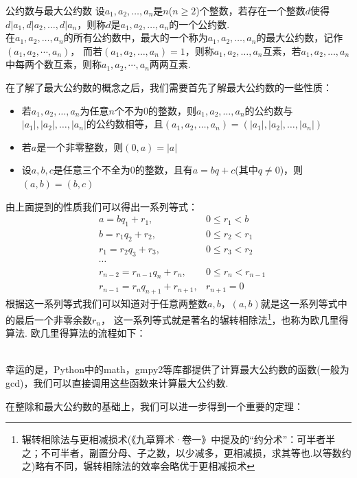 \documentclass{book}
\numberwithin{equation}{subsubsection}
\begin{document}
\begin{concept}{公约数与最大公约数}
设$a_1, a_2,\ldots,a_n$是$n$($n\ge2$)个整数，若存在一个整数$d$使得$d|a_1,d|a_2,\ldots,d|a_n$，则称$d$是$a_1,a_2,\ldots,a_n$的一个公约数.\\
在$a_1, a_2,\ldots,a_n$的所有公约数中，最大的一个称为$a_1, a_2,\ldots,a_n$的最大公约数，记作$(a_1,a_2,\cdots,a_n)$，
而若$(a_1,a_2,\ldots,a_n)=1$，则称$a_1, a_2,\ldots,a_n$互素，若$a_1, a_2,\ldots,a_n$中每两个数互素，则称$a_1, a_2,\cdots,a_n$两两互素.\par
\end{concept}

在了解了最大公约数的概念之后，我们需要首先了解最大公约数的一些性质：
\begin{itemize}
    \item 若$a_1,a_2,\ldots,a_n$为任意$n$个不为$0$的整数，则$a_1,a_2,\ldots,a_n$的公约数与$|a_1|,|a_2|,\ldots,|a_n|$的公约数相等，且$(a_1,a_2,\ldots,a_n)=(|a_1|,|a_2|,\ldots,|a_n|)$
    \item 若$a$是一个非零整数，则$(0,a)=|a|$
    \item 设$a,b,c$是任意三个不全为$0$的整数，且有$a=bq+c$(其中$q\neq0$)，则$(a,b)=(b,c)$
\end{itemize}
由上面提到的性质我们可以得出一系列等式：
\begin{equation}
\begin{aligned}
    &a=bq_1+r_1,&0\leq r_1 < b\\
    &b=r_1q_2+r_2,&0\leq r_2 < r_1\\
    &r_1=r_2q_3+r_3,&0\leq r_3 < r_2\\
    &\cdots\\
    &r_{n-2}=r_{n-1}q_n+r_n,&0\leq r_n < r_{n-1}\\
    &r_{n-1}=r_nq_{n+1}+r_{n+1},&r_{n+1}=0
\end{aligned}
\nonumber
\end{equation}
根据这一系列等式我们可以知道对于任意两整数$a,b$，$(a,b)$就是这一系列等式中的最后一个非零余数$r_n$，
这一系列等式就是著名的辗转相除法\footnote{辗转相除法与更相减损术(《九章算术·卷一》中提及的“约分术”：可半者半之；不可半者，副置分母、子之数，以少减多，更相减损，求其等也.以等数约之)略有不同，辗转相除法的效率会略优于更相减损术}，也称为欧几里得算法.
欧几里得算法的流程如下：
\begin{algorithm}
    \caption{欧几里得算法$\text{gcd}(a,b)$}
\end{algorithm}\\
幸运的是，Python中的math，gmpy2等库都提供了计算最大公约数的函数(一般为gcd)，我们可以直接调用这些函数来计算最大公约数.\par
在整除和最大公约数的基础上，我们可以进一步得到一个重要的定理：
\end{document}
